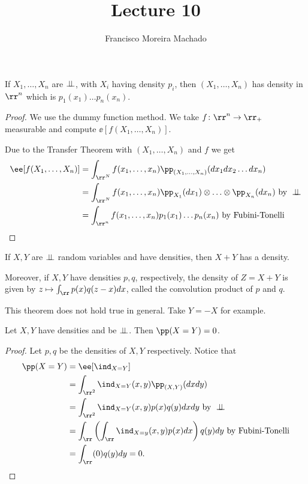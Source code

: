 \documentclass[../main.tex]{subfiles}
\author{Francisco Moreira Machado}
\title{Lecture 10}
\begin{document}
\begin{theorem}
  If $X_1, \ldots, X_n$ are $\perp\!\!\!\!\,\perp$, with $X_i$ having density $p_i$, then
  $(X_1, \ldots, X_n)$ has density in $\rr^n$ which is $p_1(x_1)
  \ldots p_n(x_n)$.
\end{theorem}

\begin{proof}
    We use the dummy function method. We take $f\colon \rr^n \to
    \rr_+$ measurable and compute $\ee[f(X_1, \ldots, X_n)]$.

    \vspace{0.2em}

    Due to the Transfer Theorem with $(X_1, \ldots, X_n)$ and $f$ we
    get
    \begin{align*}
      \ee[f(X_1, \ldots, X_n)] &= \int_{\rr^N} f(x_1, \ldots,
      x_n)\pp_{(X_1, \ldots, X_n)}(dx_1dx_2 \ldots dx_n) \\
      &= \int_{\rr^N} f(x_1, \ldots,
      x_n)\pp_{X_1}(dx_1) \otimes \ldots \otimes \pp_{X_n}(dx_n)
      \text{ by } \indep\\
      &= \int_{\rr^n} f(x_1,\ldots, x_n)p_1(x_1)\ldots p_n(x_n)
      \text{ by Fubini-Tonelli}
    \end{align*}
\end{proof}

\begin{theorem}
    If $X, Y$ are $\perp\!\!\!\!\,\perp$ random variables and have densities, then
    $X+Y$ has a density.

    \vspace{0.3em}
    \noindent Moreover, if $X, Y$ have densities $p, q$, respectively,
    the density of $Z = X+Y$ is given by $z \mapsto \int_{\rr} p(x)q(z
    - x) dx$, called the convolution product of $p$ and $q$. 
\end{theorem}

\begin{remark}
    This theorem does not hold true in general. Take $Y = -X$ for
    example.
\end{remark}

\begin{application}
  Let $X, Y$ have densities and be $\perp\!\!\!\!\,\perp$. Then $\pp(X = Y) = 0$.
\end{application}
\begin{proof}
    Let $p, q$ be the densities of $X, Y$ respectively. Notice that
    \begin{align*}
      \pp(X = Y) &= \ee[\ind_{X = Y}] \\ &= \int_{\rr^2}\ind_{X=Y}(x, y)
      \pp_{(X, Y)}(dxdy) \\
      &=\int_{\rr^2}\ind_{X=Y}(x, y)
      p(x)q(y)dxdy \text{ by } \indep \\
      &= \int_\rr \left(\int_\rr \ind_{X = y}(x, y) p(x)dx \right) q(y)dy \text{
        by Fubini-Tonelli} \\
      &= \int_{\rr} (0)q(y) dy = 0
    .\end{align*} 
\end{proof}
\end{document}
